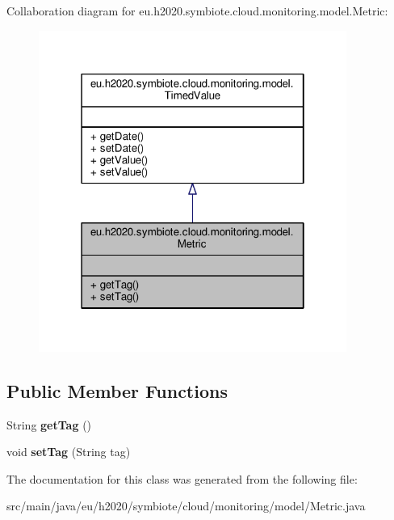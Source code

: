 Collaboration diagram for eu.\+h2020.\+symbiote.\+cloud.\+monitoring.\+model.\+Metric\+:\nopagebreak
\begin{figure}[H]
\begin{center}
\leavevmode
\includegraphics[width=286pt]{classeu_1_1h2020_1_1symbiote_1_1cloud_1_1monitoring_1_1model_1_1Metric__coll__graph}
\end{center}
\end{figure}
\subsection*{Public Member Functions}
\begin{DoxyCompactItemize}
\item 
\mbox{\label{classeu_1_1h2020_1_1symbiote_1_1cloud_1_1monitoring_1_1model_1_1Metric_ae31cc027a1129fa9947350053cf8e058}} 
String {\bfseries get\+Tag} ()
\item 
\mbox{\label{classeu_1_1h2020_1_1symbiote_1_1cloud_1_1monitoring_1_1model_1_1Metric_ab94fb1d4ce14c9ead753090bc89e9e9a}} 
void {\bfseries set\+Tag} (String tag)
\end{DoxyCompactItemize}


The documentation for this class was generated from the following file\+:\begin{DoxyCompactItemize}
\item 
src/main/java/eu/h2020/symbiote/cloud/monitoring/model/Metric.\+java\end{DoxyCompactItemize}
